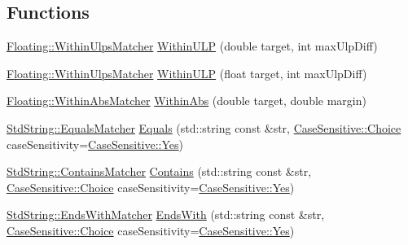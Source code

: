 \subsection*{Functions}
\begin{DoxyCompactItemize}
\item 
\mbox{\hyperlink{struct_catch_1_1_matchers_1_1_floating_1_1_within_ulps_matcher}{Floating\+::\+Within\+Ulps\+Matcher}} \mbox{\hyperlink{namespace_catch_1_1_matchers_ae895591bd78a7d0ce4cdf3cf40d89ab5}{Within\+U\+LP}} (double target, int max\+Ulp\+Diff)
\item 
\mbox{\hyperlink{struct_catch_1_1_matchers_1_1_floating_1_1_within_ulps_matcher}{Floating\+::\+Within\+Ulps\+Matcher}} \mbox{\hyperlink{namespace_catch_1_1_matchers_ab87ee77e5349fac450d1e631dee86496}{Within\+U\+LP}} (float target, int max\+Ulp\+Diff)
\item 
\mbox{\hyperlink{struct_catch_1_1_matchers_1_1_floating_1_1_within_abs_matcher}{Floating\+::\+Within\+Abs\+Matcher}} \mbox{\hyperlink{namespace_catch_1_1_matchers_a4c9ea76d47d02de0cf2d354c87c26e95}{Within\+Abs}} (double target, double margin)
\item 
\mbox{\hyperlink{struct_catch_1_1_matchers_1_1_std_string_1_1_equals_matcher}{Std\+String\+::\+Equals\+Matcher}} \mbox{\hyperlink{namespace_catch_1_1_matchers_af8af7dfc338335ed4c788cb1b37fc59f}{Equals}} (std\+::string const \&str, \mbox{\hyperlink{struct_catch_1_1_case_sensitive_aad49d3aee2d97066642fffa919685c6a}{Case\+Sensitive\+::\+Choice}} case\+Sensitivity=\mbox{\hyperlink{struct_catch_1_1_case_sensitive_aad49d3aee2d97066642fffa919685c6aa7c5550b69ec3c502e6f609b67f9613c6}{Case\+Sensitive\+::\+Yes}})
\item 
\mbox{\hyperlink{struct_catch_1_1_matchers_1_1_std_string_1_1_contains_matcher}{Std\+String\+::\+Contains\+Matcher}} \mbox{\hyperlink{namespace_catch_1_1_matchers_a1f6c2accdc6cd75a84d7112dcad647b4}{Contains}} (std\+::string const \&str, \mbox{\hyperlink{struct_catch_1_1_case_sensitive_aad49d3aee2d97066642fffa919685c6a}{Case\+Sensitive\+::\+Choice}} case\+Sensitivity=\mbox{\hyperlink{struct_catch_1_1_case_sensitive_aad49d3aee2d97066642fffa919685c6aa7c5550b69ec3c502e6f609b67f9613c6}{Case\+Sensitive\+::\+Yes}})
\item 
\mbox{\hyperlink{struct_catch_1_1_matchers_1_1_std_string_1_1_ends_with_matcher}{Std\+String\+::\+Ends\+With\+Matcher}} \mbox{\hyperlink{namespace_catch_1_1_matchers_ae5a45efb4538c57c43e04f3f9043ad6e}{Ends\+With}} (std\+::string const \&str, \mbox{\hyperlink{struct_catch_1_1_case_sensitive_aad49d3aee2d97066642fffa919685c6a}{Case\+Sensitive\+::\+Choice}} case\+Sensitivity=\mbox{\hyperlink{struct_catch_1_1_case_sensitive_aad49d3aee2d97066642fffa919685c6aa7c5550b69ec3c502e6f609b67f9613c6}{Case\+Sensitive\+::\+Yes}})

\end{DoxyCompactItemize}
